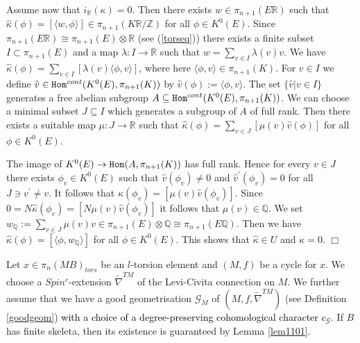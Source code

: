 \documentclass[12pt]{article}
\newcommand{\cG}{{\mathcal{G}}}
\def\hB{\hspace*{\fill}$\Box$ \newline\noindent}
\newcommand{\Z}{{\mathbb{Z}}}
\newcommand{\Q}{{\mathbb{Q}}}
\newcommand{\R}{{\mathbb{R}}}
\newcommand{\Hom}{{\tt Hom}}
\begin{document}
Assume now that $i_{\R}(\kappa)=0$. Then there exists
$w\in \pi_{n+1}(E\R)$ such that $\hat \kappa(\phi)=[\langle w,\phi\rangle]\in \pi_{n+1}(K\R/\Z)$ for all $\phi\in K^{0}(E)$. 
Since $\pi_{n+1}(E\R )\cong \pi_{n+1}(E)\otimes \R$  (see (\ref{torseq})) there exists a finite subset
$I\subset \pi_{n+1}(E)$ and a map $\lambda:I\to \R$ such that
$w=\sum_{v\in I} \lambda(v)v$. We have
$\hat \kappa(\phi)=\sum_{v\in I}[\lambda(v)\langle \phi,v\rangle]$, where here $\langle \phi,v\rangle\in \pi_{n+1}(K)$.
For $v\in I$ we define
$\hat v\in \Hom^{cont}(K^{0}(E),\pi_{n+1}(K))$ by
$\hat v(\phi):=\langle \phi,v\rangle$. The set $\{\hat v|v\in I\}$ generates a free
abelian subgroup $A\subseteq\Hom^{cont}(K^{0}(E),\pi_{n+1}(K))$.
We can choose a minimal subset $J\subseteq I$ which generates a subgroup of $A$ of full rank.
Then there exists a suitable 
map $\mu:J\to \R$   such that
$\hat \kappa(\phi)=\sum_{v\in J}[\mu(v)\hat v(\phi)]$  for all $\phi\in K^{0}(E)$.

The image of $K^{0}(E)\to \Hom(A,\pi_{n+1}(K))$ has full rank.
Hence for every $v\in J$ there exists $\phi_{v}\in K^{0}(E)$
such that $\hat v(\phi_{v})\not=0$ and $\hat v^{\prime}(\phi_{v})=0$ for all $J\ni v^{\prime}\not= v$.
It follows that $\hat \kappa(\phi_{v})=[\mu(v) \hat v(\phi_{v})]$.
Since
$0=N\hat \kappa(\phi_{v})=[N\mu(v) \hat v(\phi_{v})]$ it follows that
$\mu(v)\in \Q$. We set $w_{\Q}:=\sum_{v\in J} \mu(v)v\in \pi_{n+1}(E)\otimes \Q\cong \pi_{n+1}(E\Q)$.  Then we have
$\hat \kappa(\phi)=[\langle \phi, w_{\Q}\rangle]$ for all $\phi \in K^{0}(E)$.
This shows that $\hat \kappa\in U$ and $\kappa=0$.
\hB 








 
Let $x\in \pi_{n}(MB)_{tors}$ be an $l$-torsion element and $(M,f)$ be a cycle for $x$.
We choose a  $Spin^{c}$-extension $\tilde \nabla^{TM}$ of the Levi-Civita
connection on $M$. We further assume that we have a good geometrisation $\cG_{M}$ of $(M,f,\tilde \nabla^{TM})$ (see Definition \ref{goodgeom}) \textcolor{black}{with a choice of a degree-preserving cohomological character $c_{\cG}$}. If $B$ has finite skeleta, then its existence is guaranteed by Lemma \ref{lem1101}. 
\end{document}
